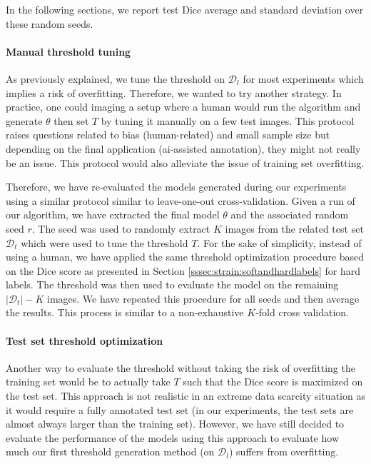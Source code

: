 In the following sections, we report test Dice average and standard deviation over these random seeds.  

\paragraph{Manual threshold tuning} As previously explained, we tune the threshold on $\mathcal{D}_l$ for most experiments which implies a risk of overfitting. Therefore, we wanted to try another strategy. In practice, one could imaging a setup where a human would run the algorithm and generate $\theta$ then set $T$ by tuning it manually on a few test images. This protocol raises questions related to bias (human-related) and small sample size but depending on the final application (\eg \acrshort{ai}-assisted annotation), they might not really be an issue. This protocol would also alleviate the issue of training set overfitting. 

Therefore, we have re-evaluated the models generated during our experiments using a similar protocol similar to leave-one-out cross-validation. Given a run of our algorithm, we have extracted the final model $\theta$ and the associated random seed $r$. The seed was used to randomly extract $K$ images from the related test set $\mathcal{D}_t$ which were used to tune the threshold $T$. For the sake of simplicity, instead of using a human, we have applied the same threshold optimization procedure based on the Dice score as presented in Section \ref{sssec:strain:softandhardlabels} for hard labels. The threshold was then used to evaluate the model on the remaining $|\mathcal{D}_t| - K$ images. We have repeated this procedure for all seeds and then average the results. This process is similar to a non-exhaustive $K$-fold cross validation. 

\paragraph{Test set threshold optimization} Another way to evaluate the threshold without taking the risk of overfitting the training set would be to actually take $T$ such that the Dice score is maximized on the test set. This approach is not realistic in an extreme data scarcity situation as it would require a fully annotated test set (in our experiments, the test sets are almost always larger than the training set). However, we have still decided to evaluate the performance of the models using this approach to evaluate how much our first threshold generation method (\ie on $\mathcal{D}_l$) suffers from overfitting.   

